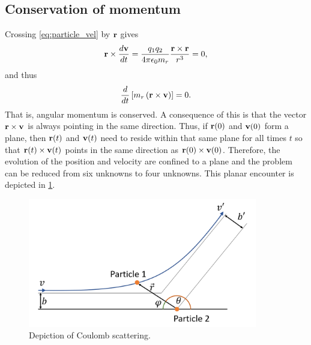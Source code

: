 \documentclass[a4paper,11pt]{report}
\begin{document}
\subsection{Conservation of momentum}
Crossing \cref{eq:particle_vel} by $\mathbf{r}$ gives
\begin{equation}
    \mathbf{r} \times \frac{d \mathbf{v}}{dt} = \frac{q_1 q_2}{4 \pi \epsilon_0 m_r} \frac{\mathbf{r} \times \mathbf{r}}{r^3} = 0,
\end{equation}
and thus
\begin{equation}
    \frac{d}{dt} \left [ m_r \left ( \mathbf{r} \times \mathbf{v} \right ) \right ] = 0.
\end{equation}
That is, angular momentum is conserved. A consequence of this is that the vector $\mathbf{r} \times \mathbf{v}$ is always pointing in the same direction. Thus, if $\mathbf{r}(0)$ and $\mathbf{v}(0)$ form a plane, then $\mathbf{r}(t)$ and $\mathbf{v}(t)$ need to reside within that same plane for all times $t$ so that $\mathbf{r}(t) \times \mathbf{v}(t)$ points in the same direction as $\mathbf{r}(0) \times \mathbf{v}(0)$. Therefore, the evolution of the position and velocity are confined to a plane and the problem can be reduced from six unknowns to four unknowns. This planar encounter is depicted in \cref{fig:coulomb_scattering}.
\begin{figure}[ht]
    \centering
    \includegraphics[width=10cm]{../../images/coulomb_scattering.png}
    \caption{Depiction of Coulomb scattering.}
    \label{fig:coulomb_scattering}
    \end{figure}

\end{document}
